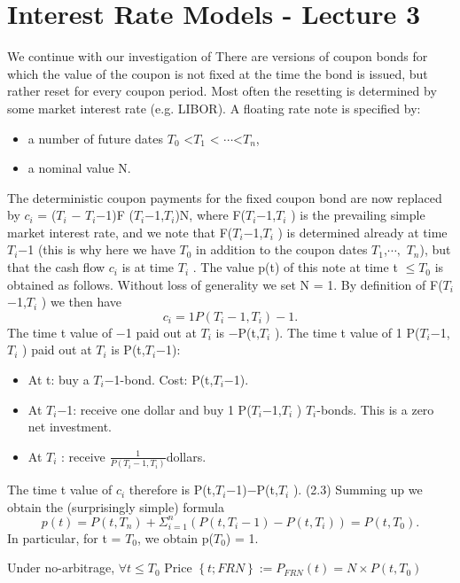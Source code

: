 \section{Interest Rate Models - Lecture 3}
We continue with our investigation of 
There are versions of coupon bonds for which the value of the coupon is not fixed
at the time the bond is issued, but rather reset for every coupon period. Most often
the resetting is determined by some market interest rate (e.g. LIBOR).
A floating rate note is specified by:
\begin{itemize}
\item a number of future dates $T_0$ <$T_1$ < $\cdots$<$T_n$,
\item a nominal value N.
\end{itemize}
The deterministic coupon payments for the fixed coupon bond are now replaced by
$c_i$ = ($T_i$ − $T_i$−1)F ($T_i$−1,$T_i$)N,
where F($T_i$−1,$T_i$ ) is the prevailing simple market interest rate, and we note that
F($T_i$−1,$T_i$ ) is determined already at time $T_i$−1 (this is why here we have $T_0$ in
addition to the coupon dates $T_1$,$\cdots,$ $T_n$), but that the cash flow $c_i$ is at time $T_i$ .
The value p(t) of this note at time t  $ \leq T_0$ is obtained as follows. Without loss of
generality we set N = 1. By definition of F($T_i$−1,$T_i$ ) we then have
\begin{equation}c_i = 1
P(T_i−1,T_i) −1.\end{equation}
The time t value of −1 paid out at $T_i$ is −P(t,$T_i$ ). The time t value of 1
P($T_i$−1,$T_i$ )
paid out at $T_i$ is P(t,$T_i$−1):
\begin{itemize}
\item At t: buy a $T_i$−1-bond. Cost: P(t,$T_i$−1).
\item At $T_i$−1: receive one dollar and buy 1
P($T_i$−1,$T_i$ ) $T_i$-bonds. This is a zero net investment.
\item At $T_i$ : receive $\frac{1}
{P(T_i−1,T_i )}$dollars.
\end{itemize}
The time t value of $c_i$ therefore is
P(t,$T_i$−1)−P(t,$T_i$ ). (2.3)
Summing up we obtain the (surprisingly simple) formula
\begin{equation}
p(t) = P(t,T_n)+
\Sigma^{n}
_{i=1}
(P(t,T_i−1)−P(t,T_i )) = P(t,T_0).\end{equation}
In particular, for t = $T_0$, we obtain p($T_0$) = 1.
\begin{prop}
 Under no-arbitrage, $\forall t \leq T_0$ Price $\left\lbrace t;
 FRN \right\rbrace:= P_{FRN}(t) = N \times P(t,T_0)$
\end{prop}
